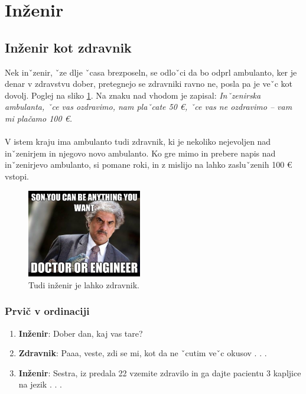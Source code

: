\documentclass[12pt, a4paper]{article}
\begin{document}
\section{Inženir}

\subsection{Inženir kot zdravnik}
Nek inˇzenir, ˇze dlje ˇcasa brezposeln, se odloˇci da bo odprl ambulanto, ker je denar v zdravstvu dober, pretegnejo se zdravniki ravno ne, posla pa je veˇc kot dovolj. Poglej na sliko \ref{fig:inzenir_zdravnik}. Na znaku nad vhodom je zapisal: \textit{Inˇzenirska ambulanta, ˇce vas ozdravimo, nam plaˇcate 50 \euro, ˇce vas ne ozdravimo – vam mi plačamo 100 \euro.}
\\ \\
\indent
V istem kraju ima ambulanto tudi zdravnik, ki je nekoliko nejevoljen nad inˇzenirjem in njegovo novo ambulanto. Ko gre mimo in prebere napis nad inˇzenirjevo ambulanto, si pomane roki, in z mislijo na lahko zasluˇzenih 100 € vstopi.


\begin{figure}[h]
\centering \includegraphics[width=5cm]{Inzenir_doktor.jpg}
\caption{Tudi inženir je lahko zdravnik.}
\label{fig:inzenir_zdravnik}
\end{figure}

\subsubsection{Prvič v ordinaciji}

\begin{enumerate}
\item \textbf{Inženir}: Dober dan, kaj vas tare?
\item \textbf{Zdravnik}: Paaa, veste, zdi se mi, kot da ne ˇcutim veˇc okusov . . .
\item \textbf{Inženir}: Sestra, iz predala 22 vzemite zdravilo in ga dajte pacientu 3
kapljice na jezik . . .

\end{enumerate}
\end{document}
